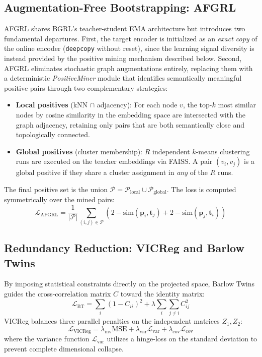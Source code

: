 \documentclass[conference]{IEEEtran}
\begin{document}
\subsection{Augmentation-Free Bootstrapping: AFGRL}
AFGRL \cite{afgrl} shares BGRL's teacher-student EMA architecture but introduces two fundamental departures. First, the target encoder is initialized as an \textit{exact copy} of the online encoder (\texttt{deepcopy} without reset), since the learning signal diversity is instead provided by the positive mining mechanism described below. Second, AFGRL eliminates stochastic graph augmentations entirely, replacing them with a deterministic \textit{PositiveMiner} module that identifies semantically meaningful positive pairs through two complementary strategies:
\begin{itemize}
    \item \textbf{Local positives} (kNN $\cap$ adjacency): For each node $v$, the top-$k$ most similar nodes by cosine similarity in the embedding space are intersected with the graph adjacency, retaining only pairs that are both semantically close and topologically connected.
    \item \textbf{Global positives} (cluster membership): $R$ independent $k$-means clustering runs are executed on the teacher embeddings via FAISS. A pair $(v_i, v_j)$ is a global positive if they share a cluster assignment in \textit{any} of the $R$ runs.
\end{itemize}
The final positive set is the union $\mathcal{P} = \mathcal{P}_{\text{local}} \cup \mathcal{P}_{\text{global}}$. The loss is computed symmetrically over the mined pairs:
\begin{equation}
\mathcal{L}_{\text{AFGRL}} = \frac{1}{|\mathcal{P}|} \sum_{(i,j) \in \mathcal{P}} \left( 2 - \text{sim}(\bm{p}_i, \bm{t}_j) + 2 - \text{sim}(\bm{p}_j, \bm{t}_i) \right)
\end{equation}

\subsection{Redundancy Reduction: VICReg and Barlow Twins}
By imposing statistical constraints directly on the projected space, Barlow Twins \cite{barlow} guides the cross-correlation matrix $C$ toward the identity matrix:
\begin{equation}
\mathcal{L}_{\text{BT}} = \sum_{i}(1 - C_{ii})^2 + \lambda \sum_{i} \sum_{j \neq i} C_{ij}^2
\end{equation}
VICReg \cite{vicreg} balances three parallel penalties on the independent matrices $Z_1, Z_2$:
\begin{equation}
\mathcal{L}_{\text{VICReg}} = \lambda_{\text{inv}}\text{MSE} + \lambda_{\text{var}}\mathcal{L}_{\text{var}} + \lambda_{\text{cov}}\mathcal{L}_{\text{cov}}
\end{equation}
where the variance function $\mathcal{L}_{\text{var}}$ utilizes a hinge-loss on the standard deviation to prevent complete dimensional collapse.
\end{document}
